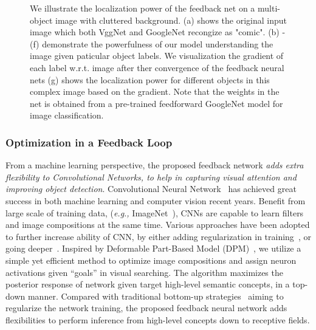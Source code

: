\begin{figure}[htb]
\begin{center}
\caption{We illustrate the localization power of the feedback net on a multi-object image with cluttered background. (a) shows the original input image which both VggNet and GoogleNet recongize as "comic". (b) - (f) demonstrate the powerfulness of our model understanding the image given paticular object labels. We visualization the gradient of each label w.r.t. image after ther convergence of the feedback neural nets (g) shows the localization power for different objects in this complex image based on the gradient. Note that the weights in the net is obtained from a pre-trained feedforward GoogleNet model for image classification.}
\label{fig:splah}
\end{center}
\end{figure}

\subsubsection*{Optimization in a Feedback Loop}
From a machine learning perspective, the proposed feedback network \emph{adds extra flexibility to Convolutional Networks, to help in capturing visual attention and improving object detection}. Convolutional Neural Network~\cite{lecun1998gradient, Krizhevsky2012ImageNet, Simonyan2014Very} has achieved great success in both machine learning and computer vision recent years. Benefit from large scale of training data, (\emph{e.g.,} ImageNet~\cite{deng2009imagenet}), CNNs are capable to learn filters and image compositions at the same time. Various approaches have been adopted to further increase ability of CNN, by either adding regularization in training~\cite{he2015delving,ioffe2015batch}, or going deeper~\cite{Simonyan2014Very, Szegedy2014Going}. Inspired by Deformable Part-Based Model (DPM)~\cite{Felzenszwalb2010Object}, we utilize a simple yet efficient method to optimize image compositions and assign neuron activations given ``goals'' in visual searching. The algorithm maximizes the posterior response of network given target high-level semantic concepts, in a top-down manner. Compared with traditional bottom-up strategies~\cite{he2015delving, ioffe2015batch} aiming to regularize the network training, the proposed feedback neural network adds flexibilities to perform inference from high-level concepts down to receptive fields.

